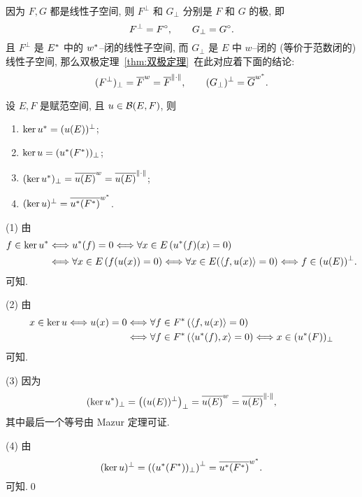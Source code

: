 \begin{Remark}
	因为 $ F, G $ 都是线性子空间, 则 $ F^{\bot} $ 和 $ G_{\bot} $ 分别是 $ F $ 和 $ G $ 的极, 即
	\[
		F^{\bot}=F^{\circ},\qquad G_{\bot}=G^{\circ}.
	\]
	且 $ F^{\bot} $ 是 $ E^{*} $ 中的 $ w^{*} $--闭的线性子空间, 而 $ G_{\bot} $ 是 $ E $ 中 $ w $--闭的 (等价于范数闭的) 线性子空间, 那么双极定理~\ref{thm:双极定理}~在此对应着下面的结论:
	\[
		(F^{\bot})_{\bot}=\overline{F}^{w}=\overline{F}^{\left\| \cdot \right\|}, \qquad (G_{\bot})^{\bot}=\overline{G}^{w^{*}}.
	\]
\end{Remark}

\begin{Theorem}
	设 $ E, F $ 是赋范空间, 且 $ u\in\mathcal{B}(E, F) $, 则
	\begin{enumerate}[(1)]
		\item $ \ker u^{*}=(u(E))^{\bot} $;
		\item $ \ker u=(u^{*}(F^{*}))_{\bot} $;
		\item $ (\ker u^{*})_{\bot}=\overline{u(E)}^{w}=\overline{u(E)}^{\left\| \cdot \right\|} $;
		\item $ (\ker u)^{\bot}=\overline{u^{*}(F^{*})}^{w^{*}} $.
	\end{enumerate}
\end{Theorem}
\begin{Proof}
	(1) 由
	\[
		\begin{aligned}
			f\in\ker u^{*} & \Longleftrightarrow u^{*}(f)=0 \Longleftrightarrow \forall x\in E\,(u^{*}(f)(x)=0)                                                      \\
			                 & \Longleftrightarrow \forall x\in E\,(f(u(x))=0) \Longleftrightarrow \forall x\in E(\left\langle f, u(x) \right\rangle=0)\Longleftrightarrow f\in(u(E))^{\bot}.
		\end{aligned}
	\]
	可知.

	(2) 由
	\[
		\begin{aligned}
			x\in\ker u\Longleftrightarrow u(x)=0 & \Longleftrightarrow \forall f\in F^{*}\,(\left\langle f, u(x) \right\rangle=0)                                                    \\
			                                     & \Longleftrightarrow \forall f\in F^{*}\,(\left\langle u^{*}(f), x \right\rangle=0)\Longleftrightarrow x\in(u^{*}(F))_{\bot}
		\end{aligned}
	\]
	可知.

	(3) 因为
	\[
		(\ker u^{*})_{\bot}=\left( (u(E))^{\bot} \right)_{\bot}=\overline{u(E)}^{w}=\overline{u(E)}^{\left\| \cdot \right\|},
	\]
	其中最后一个等号由 Mazur 定理可证.

	(4) 由
	\[
		(\ker u)^{\bot}=\left( (u^{*}(F^{*}))_{\bot} \right)^{\bot}=\overline{u^{*}(F^{*})}^{w^{*}}.
	\]
	可知.\qed
\end{Proof}

